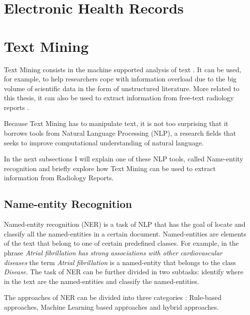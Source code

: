 \label{chap2}


\section{Electronic Health Records}



\section{Text Mining}

Text Mining consists in the machine supported analysis of text \citep{Hotho2005}. It can be used, for example, to help researchers cope with information overload \citep{Cohen2005a} due to the big volume of scientific data in the form of unstructured literature. More related to this thesis, it can also be used to extract information from free-text radiology reports \citep{Pons2016}. 

Because Text Mining has to manipulate text, it is not too surprising that it borrows tools from Natural Language Processing (NLP), a research fields that seeks to improve computational understanding of natural language. 

In the next subsections I will explain one of these NLP tools, called Name-entity recognition and briefly explore how Text Mining can be used to extract information from Radiology Reports.

\subsection{Name-entity Recognition}

Named-entity recognition (NER) is a task of NLP that has the goal of locate and classify all the named-entities in a certain document. Named-entities are elements of the text that belong to one of certain predefined classes. For example, in the phrase \textit{Atrial fibrillation has strong associations with other cardiovascular diseases} the term \textit{Atrial fibrillation} is a named-entity that belongs to the class \textit{Disease}. The task of NER can be further divided in two subtasks: identify where in the text are the named-entities and classify the named-entities.

The approaches of NER can be divided into three categories \citep{Mansouri2008}: Rule-based approaches, Machine Learning based approaches and hybrid approaches. 

